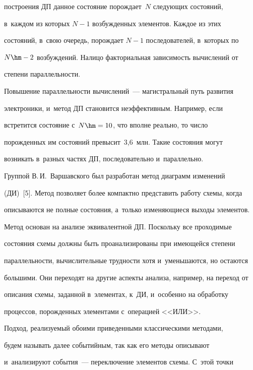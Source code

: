 построения ДП данное состояние порождает~$N$ следующих состояний, 


в~каждом из которых $N-1$ возбужденных элементов. Каждое из этих 


состояний, в~свою очередь, порождает $N-1$ последователей, в~которых по 


$N\hm- 2$ возбуждений. Налицо факториальная зависимость вычислений от 


степени параллельности.


   


   Повышение параллельности вычислений~--- магистральный путь развития 


электроники, и~метод ДП становится неэффективным. Например, если 


встретится состояние с~$N\hm = 10$, что вполне реально, то число 


порожденных им состояний превысит~3,6~млн. Такие состояния могут 


возникать в~разных частях ДП, последовательно и~параллельно.


   


   Группой В.\,И.~Варшавского был разработан метод диаграмм изменений 


(ДИ)~[5]. Метод позволяет более компактно представить работу схемы, когда 


описываются не полные состояния, а~только изменяющиеся выходы элементов. 


Метод основан на анализе эквивалентной ДП. Поскольку все проходимые 


состояния схемы должны быть проанализированы при имеющейся степени 


параллельности, вычислительные трудности хотя и~уменьшаются, но остаются 


большими. Они переходят на другие аспекты анализа, например, на переход от 


описания схемы, заданной в~элементах, к~ДИ, и~особенно на обработку 


процессов, порожденных элементами с~операцией <<ИЛИ>>.


   


   Подход, реализуемый обоими приведенными классическими методами, 


будем называть далее событийным, так как его методы описывают 


и~анализируют события~--- переключение элементов схемы. С~этой точки 


